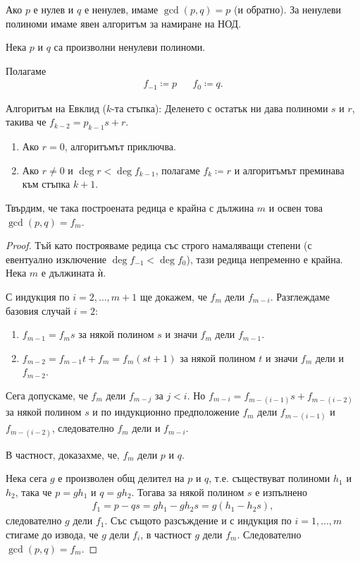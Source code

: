 \documentclass[numbers=endperiod, bibliography=totocnumbered]{scrartcl}
\begin{document}
Ако \( p \) е нулев и \( q \) е ненулев, имаме \( \gcd(p, q) = p \) (и обратно). За ненулеви полиноми имаме явен алгоритъм за намиране на НОД.
\begin{theorem}
  Нека \( p \) и \( q \) са произволни ненулеви полиноми.

  Полагаме
  \begin{align*}
     f_{-1} \coloneqq p &&
     f_0 \coloneqq q.
  \end{align*}

  Алгоритъм на Евклид (\( k \)-та стъпка): Деленето с остатък ни дава полиноми \( s \) и \( r \), такива че \( f_{k-2} = p_{k-1} s + r \).
    \begin{enumerate}
      \item Ако \( r = 0 \), алгоритъмът приключва.
      \item Ако \( r \neq 0 \) и \( \deg r < \deg f_{k-1} \), полагаме \( f_k \coloneqq r \) и алгоритъмът преминава към стъпка \( k + 1 \).
    \end{enumerate}

  Твърдим, че така построената редица е крайна с дължина \( m \) и освен това \( \gcd(p, q) = f_m \).
\end{theorem}
\begin{proof}
  Тъй като построяваме редица със строго намаляващи степени (с евентуално изключение \( \deg f_{-1} < \deg f_0 \)), тази редица непременно е крайна. Нека \( m \) е дължината ѝ.

  С индукция по \( i = 2, \ldots, m + 1 \) ще докажем, че \( f_m \) дели \( f_{m-i} \). Разглеждаме базовия случай \( i = 2 \):
  \begin{enumerate}
    \item \( f_{m-1} = f_m s \) за някой полином \( s \) и значи \( f_m \) дели \( f_{m-1} \).
    \item \( f_{m-2} = f_{m-1} t + f_m = f_m (s t + 1) \) за някой полином \( t \) и значи \( f_m \) дели и \( f_{m-2} \).
  \end{enumerate}

  Сега допускаме, че \( f_m \) дели \( f_{m-j} \) за \( j < i \). Но \( f_{m-i} = f_{m-(i-1)} s + f_{m-(i-2)} \) за някой полином \( s \) и по индукционно предположение \( f_m \) дели \( f_{m-(i-1)} \) и \( f_{m-(i-2)} \), следователно \( f_m \) дели и \( f_{m-i} \).

  В частност, доказахме, че, \( f_m \) дели \( p \) и \( q \).

  Нека сега \( g \) е произволен общ делител на \( p \) и \( q \), т.е. съществуват полиноми \( h_1 \) и \( h_2 \), така че \( p = g h_1 \) и \( q = g h_2 \). Тогава за някой полином \( s \) е изпълнено
  \begin{align*}
    f_1 = p - qs = g h_1 - g h_2 s = g (h_1 - h_2 s),
  \end{align*}
  следователно \( g \) дели \( f_1 \). Със същото разсъждение и с индукция по \( i = 1, \ldots, m \) стигаме до извода, че \( g \) дели \( f_i \), в частност \( g \) дели \( f_m \). Следователно \( \gcd(p, q) = f_m \).
\end{proof}
\end{document}
